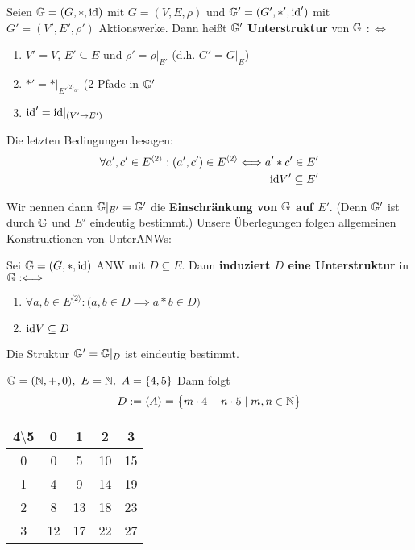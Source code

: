 \begin{definition}\enter
Seien $\mathbb{G}=(G,\ast,\text{id})$ mit $G=(V,E,\rho)$ und $\mathbb{G}'=(G',\ast',\text{id}')$ mit $G'=(V',E',\rho')$ Aktionswerke. Dann heißt $\mathbb{G}'$ \textbf{Unterstruktur} von $\mathbb{G}$ $:\Longleftrightarrow$
\begin{enumerate}
\item $V'=V$, $E'\subseteq E$ und $\rho'=\rho|_{E'}$ (d.h. $G'=G|_E$)
\item $\ast'=\ast|_{E'^{\langle 2\rangle_{G'}}}$ (2 Pfade in $\mathbb{G}'$
\item $\text{id}'=\text{id}|_{(V'\to E')}$
\end{enumerate}
Die letzten Bedingungen besagen:
\begin{align*}
\forall a',c'\in E^{\langle2\rangle}:(a',c')\in E^{\langle2\rangle}\Longleftrightarrow a'\ast c'\in E'\\
\text{id} V'\subseteq E'
\end{align*}
\end{definition}

Wir nennen dann $\mathbb{G}|_{E'}=\mathbb{G}'$ die \textbf{Einschränkung von $\mathbb{G}$ auf $E'$}. (Denn $\mathbb{G}'$ ist durch $\mathbb{G}$ und $E'$ eindeutig bestimmt.)\nl
Unsere Überlegungen folgen allgemeinen Konstruktionen von UnterANWs:

\begin{definition}
Sei $\mathbb{G}=(G,\ast,\text{id})$ ANW mit $D\subseteq E$. Dann \textbf{induziert $D$ eine Unterstruktur} in $\mathbb{G}:\Longleftrightarrow$
\begin{enumerate}
\item $\forall a,b\in E^{\langle2\rangle}:\big(a,b\in D\implies a\ast b\in D\big)$
\item $\text{id} V\subseteq D$
\end{enumerate}
Die Struktur $\mathbb{G}'=\mathbb{G}|_D$ ist eindeutig bestimmt.
\end{definition}

\begin{beispiel}
$\mathbb{G}=(\mathbb{N},+,0),~E=\mathbb{N},~A=\lbrace 4,5\rbrace$ Dann folgt
\begin{align*}
D:=\langle A\rangle=\big\lbrace m\cdot 4+n\cdot 5\mid m,n\in\mathbb{N}\big\rbrace
\end{align*}
\begin{tabular}{c|cccc}
4$\setminus$5 & 0 & 1 & 2 & 3\\ \hline
0 & 0 & 5 & 10 & 15\\
1 & 4 & 9 & 14 & 19\\
2 & 8 & 13 & 18 & 23\\
3 & 12 & 17 & 22 & 27
\end{tabular}
\end{beispiel}


